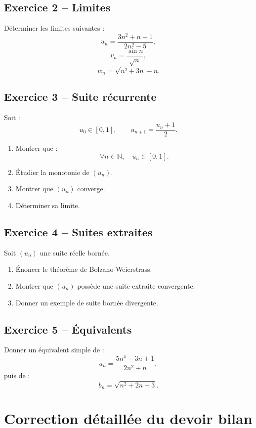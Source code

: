 \documentclass[11pt,a4paper]{article}
\newcommand{\N}{\mathbb N}
\begin{document}
\subsection*{Exercice 2 -- Limites}

Déterminer les limites suivantes :
\[
u_n=\frac{3n^2+n+1}{2n^2-5},
\]
\[
v_n=\frac{\sin n}{\sqrt n},
\]
\[
w_n=\sqrt{n^2+3n}-n.
\]

\subsection*{Exercice 3 -- Suite récurrente}

Soit :
\[
u_0\in[0,1],
\qquad
u_{n+1}=\frac{u_n+1}{2}.
\]

\begin{enumerate}
    \item Montrer que :
    \[
    \forall n\in\N,\quad u_n\in[0,1].
    \]
    \item Étudier la monotonie de \((u_n)\).
    \item Montrer que \((u_n)\) converge.
    \item Déterminer sa limite.
\end{enumerate}

\subsection*{Exercice 4 -- Suites extraites}

Soit \((u_n)\) une suite réelle bornée.
\begin{enumerate}
    \item Énoncer le théorème de Bolzano-Weierstrass.
    \item Montrer que \((u_n)\) possède une suite extraite convergente.
    \item Donner un exemple de suite bornée divergente.
\end{enumerate}

\subsection*{Exercice 5 -- Équivalents}

Donner un équivalent simple de :
\[
a_n=\frac{5n^4-3n+1}{2n^2+n},
\]
puis de :
\[
b_n=\sqrt{n^2+2n+3}.
\]

\newpage

\section{Correction détaillée du devoir bilan}
\end{document}
